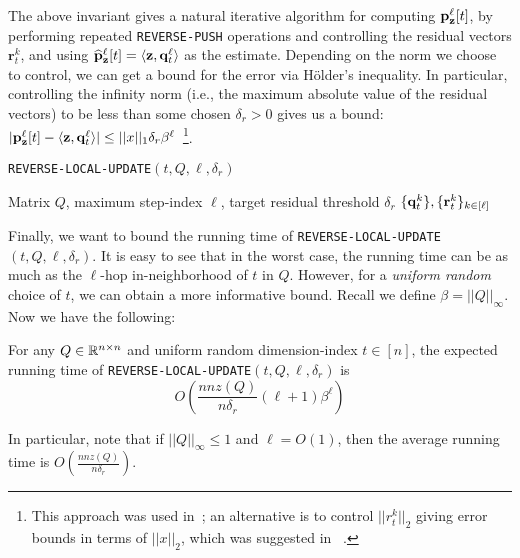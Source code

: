The above invariant gives a natural iterative algorithm for computing ${\mathbf{p}}_\mathbf{z}^{\ell}[t]$, by performing repeated \texttt{REVERSE-PUSH} operations and controlling the residual vectors $\mathbf{r}_t^k$, and using $\widehat{\mathbf{p}}_\mathbf{z}^{\ell}[t] = \langle\mathbf{z},\mathbf{q}_t^{\ell}\rangle$ as the estimate. 
Depending on the norm we choose to control, we can get a bound for the error via H{\"o}lder's inequality.
In particular, controlling the infinity norm (i.e., the maximum absolute value of the residual vectors) to be less than some chosen $\delta_r>0$ gives us a bound: $|{\mathbf{p}}_\mathbf{z}^{\ell}[t] - \langle\mathbf{z},\mathbf{q}_t^{\ell}\rangle|\leq ||x||_1\delta_r\beta^{\ell}$~\footnote{This approach was used in~\cite{andersen2007local,Lofgren2014,banerjee2015fast}; an alternative is to control $||r_t^k||_2$ giving error bounds in terms of $||x||_2$, which was suggested in ~\cite{lee2014asynchronous}.}.

\begin{algorithm}[ht]
\caption{\texttt{REVERSE-LOCAL-UPDATE}$(t,Q, \ell, \delta_r)$}
\label{alg:rwork}
\begin{algorithmic}[1]
\REQUIRE Matrix $Q$, maximum step-index $\ell$, target residual threshold $\delta_r$
\ENDWHILE
\ENDFOR
\RETURN $\{\mathbf{q}^{k}_t\}, \{\mathbf{r}^{k}_t\}_{k \in[\ell]}$
\end{algorithmic}
\end{algorithm}    

Finally, we want to bound the running time of \texttt{REVERSE-LOCAL-UPDATE}$(t,Q,\ell,\delta_r)$. 
It is easy to see that in the worst case, the running time can be as much as the $\ell$-hop in-neighborhood of $t$ in $Q$. 
However, for a \emph{uniform random} choice of $t$, we can obtain a more informative bound. 
Recall we define $\beta =  ||Q||_{\infty}$. Now we have the following:

\begin{lemma}
\label{lem:pushruntime}
For any $Q\in\mathbb{R}^{n\times n}$ and uniform random dimension-index $t\in[n]$, the expected running time of \texttt{REVERSE-LOCAL-UPDATE}$(t,Q,\ell,\delta_r)$ is 
$$O\left(\frac{nnz(Q)}{n\delta_r}(\ell+1)\beta^{\ell}\right)$$ 
\end{lemma}

In particular, note that if $||Q||_{\infty}\leq 1$ and $\ell=O(1)$, then the average running time is $O\left(\frac{nnz(Q)}{n\delta_r}\right)$.

